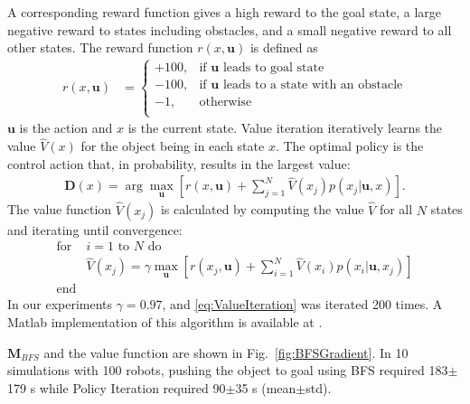  A corresponding reward function gives a high reward to the goal state,  
 a large negative reward to states including obstacles, and a small negative reward to all other states.
The reward function $r(x,\mathbf{u})$ is defined as
\begin{align}
r(x,\mathbf{u}) &=  \left\{
\begin{array}{ll}
     +100, &  \textrm{if } \mathbf{u} \textrm{ leads to goal state}\\
      -100, & \textrm{if } \mathbf{u} \textrm{ leads to a state with an obstacle} \\
      -1, & \textrm{otherwise}\\
\end{array} 
\right.
\end{align}
 $\mathbf{u}$ is the action and $x$ is the current state. 
  Value iteration iteratively learns the value $\hat{V}(x)$ for the object being in each state $x$. The optimal policy is the control action that, in probability, results in the largest value:
   \begin{align} \mathbf{D}(x) = \arg\max_{\mathbf{u}}   [ r(x,\mathbf{u}) + \sum\limits_{j=1}^N \hat{V}(x_j) p(x_j| \mathbf{u},x)].  \label{eq:OptimalPolicy}
   \end{align}
   The value function $\hat{V}(x_j) $ is calculated by computing the value $\hat{V}$ for all $N$ states and iterating until convergence:
\begin{align}
\text{for }&\text{$i=1$ to $N$ do} \nonumber \\
&\hat{V} (x_j) = \gamma \max_{\mathbf{u}} [r(x_j,\mathbf{u}) + \sum\limits_{i=1}^N \hat{V}(x_i) p(x_i| \mathbf{u},x_j)] \label{eq:ValueIteration} \nonumber\\
\text{end}& 
\end{align}
In our experiments $\gamma = 0.97$, and \eqref{eq:ValueIteration} was iterated 200 times. A {\sc Matlab} implementation of this algorithm is available at \cite{Becker2015MDP}.

$\mathbf{M}_{BFS}$ and the value function are shown in Fig.~\ref{fig:BFSGradient}. 
In 10 simulations with 100 robots, pushing the object to goal using BFS required 183$\pm$179 s while Policy Iteration required 90$\pm$35 s (mean$\pm$std).

